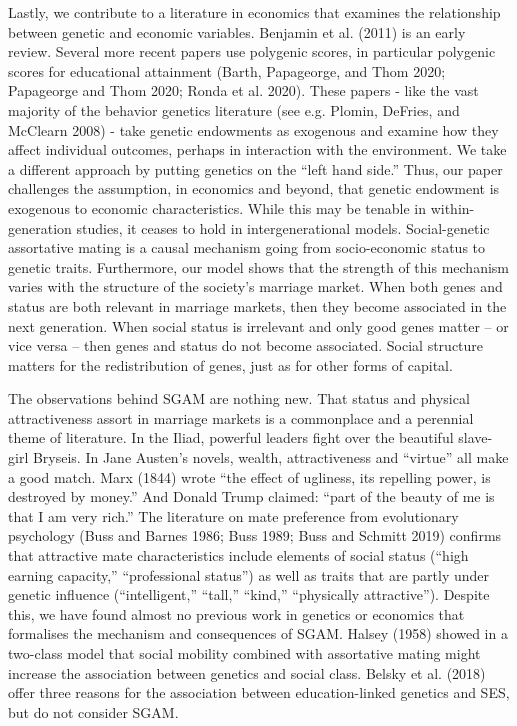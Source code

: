 \documentclass[
]{article}
\begin{document}
Lastly, we contribute to a literature in economics that examines the
relationship between genetic and economic variables. Benjamin et al. (2011) is an
early review. Several more recent papers use polygenic scores, in particular
polygenic scores for educational attainment (Barth, Papageorge, and Thom 2020; Papageorge and Thom 2020; Ronda et al. 2020). These papers - like the vast majority
of the behavior genetics literature (see e.g. Plomin, DeFries, and McClearn 2008) - take
genetic endowments as exogenous and examine how they affect individual outcomes,
perhaps in interaction with the environment. We take a different approach by
putting genetics on the ``left hand side.'' Thus, our paper challenges the
assumption, in economics and beyond, that genetic endowment is exogenous to
economic characteristics. While this may be tenable in within-generation
studies, it ceases to hold in intergenerational models. Social-genetic
assortative mating is a causal mechanism going from socio-economic status to
genetic traits. Furthermore, our model shows that the strength of this mechanism
varies with the structure of the society's marriage market. When both genes and
status are both relevant in marriage markets, then they become associated in the
next generation. When social status is irrelevant and only good genes matter --
or vice versa -- then genes and status do not become associated. Social structure
matters for the redistribution of genes, just as for other forms of capital.

The observations behind SGAM are nothing new. That status and physical
attractiveness assort in marriage markets is a commonplace and a perennial theme
of literature. In the Iliad, powerful leaders fight over the beautiful
slave-girl Bryseis. In Jane Austen's novels, wealth, attractiveness and ``virtue''
all make a good match. Marx (1844) wrote ``the effect of ugliness, its repelling
power, is destroyed by money.'' And Donald Trump claimed: ``part of the beauty of
me is that I am very rich.'' The literature on mate preference from evolutionary
psychology (Buss and Barnes 1986; Buss 1989; Buss and Schmitt 2019) confirms
that attractive mate characteristics include elements of social status (``high
earning capacity,'' ``professional status'') as well as traits that are partly
under genetic influence (``intelligent,'' ``tall,'' ``kind,'' ``physically
attractive''). Despite this, we have found almost no previous work in genetics or
economics that formalises the mechanism and consequences of SGAM.
Halsey (1958) showed in a two-class model that social mobility combined
with assortative mating might increase the association between genetics and
social class. Belsky et al. (2018) offer three reasons for the association between
education-linked genetics and SES, but do not consider SGAM.
\end{document}
